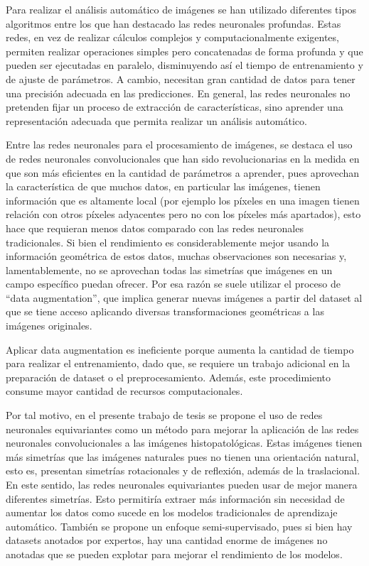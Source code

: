 \documentclass[12pt,letterpaper,final, openany]{scrbook}
\begin{document}
Para realizar el análisis automático de imágenes se han utilizado diferentes tipos algoritmos entre los que han destacado las redes neuronales profundas. Estas redes, en vez de realizar cálculos complejos y computacionalmente exigentes, permiten realizar operaciones simples pero concatenadas de forma profunda y que pueden ser ejecutadas en paralelo, disminuyendo así el tiempo de entrenamiento y de ajuste de parámetros. A cambio, necesitan gran cantidad de datos para tener una precisión adecuada en las predicciones. En general, las redes neuronales no pretenden fijar un proceso de extracción de características, sino aprender una representación adecuada que permita realizar un análisis automático.

Entre las redes neuronales para el procesamiento de imágenes, se destaca el uso de redes neuronales convolucionales que han sido revolucionarias en la medida en que son más eficientes en la cantidad de parámetros a aprender, pues aprovechan la característica de que muchos datos, en particular las imágenes, tienen información que es altamente local (por ejemplo los píxeles en una imagen tienen relación con otros píxeles adyacentes pero no con los píxeles más apartados), esto hace que requieran menos datos comparado con las redes neuronales tradicionales. Si bien el rendimiento es considerablemente mejor usando la información geométrica de estos datos, muchas observaciones son necesarias y, lamentablemente, no se aprovechan todas las simetrías que imágenes en un campo específico puedan ofrecer. Por esa razón se suele utilizar el proceso de “data augmentation”, que implica generar nuevas imágenes a partir del dataset al que se tiene acceso aplicando diversas transformaciones geométricas a las imágenes originales.

Aplicar data augmentation es ineficiente porque aumenta la cantidad de tiempo para realizar el entrenamiento, dado que, se requiere un trabajo adicional en la preparación de dataset o el preprocesamiento. Además, este procedimiento consume mayor cantidad de recursos computacionales.

Por tal motivo, en el presente trabajo de tesis se propone el uso de redes neuronales equivariantes como un método para mejorar la aplicación de las redes neuronales convolucionales a las imágenes histopatológicas. Estas imágenes tienen más simetrías que las imágenes naturales pues no tienen una orientación natural, esto es, presentan simetrías rotacionales y de reflexión, además de la traslacional. En este sentido, las redes neuronales equivariantes pueden usar de mejor manera diferentes simetrías. Esto permitiría extraer más información sin necesidad de aumentar los datos como sucede en los modelos tradicionales de aprendizaje automático.
También se propone un enfoque semi-supervisado, pues si bien hay datasets anotados por expertos, hay una cantidad enorme de imágenes no anotadas que se pueden explotar para mejorar el rendimiento de los modelos.
\end{document}
